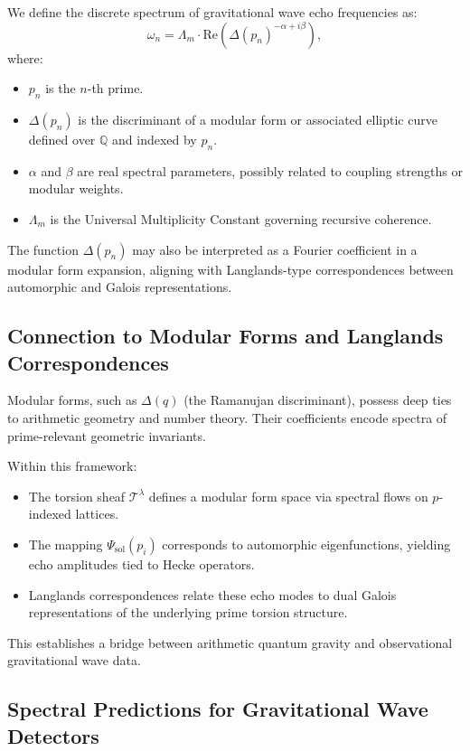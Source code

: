 \documentclass{article}
\theoremstyle{plain}
\begin{document}
We define the discrete spectrum of gravitational wave echo frequencies as:
\[
\omega_n = \Lambda_m \cdot \text{Re}\left(\Delta(p_n)^{-\alpha + i\beta} \right),
\]
where:
\begin{itemize}
    \item $p_n$ is the $n$-th prime.
    \item $\Delta(p_n)$ is the discriminant of a modular form or associated elliptic curve defined over $\mathbb{Q}$ and indexed by $p_n$.
    \item $\alpha$ and $\beta$ are real spectral parameters, possibly related to coupling strengths or modular weights.
    \item $\Lambda_m$ is the Universal Multiplicity Constant governing recursive coherence.
\end{itemize}

The function $\Delta(p_n)$ may also be interpreted as a Fourier coefficient in a modular form expansion, aligning with Langlands-type correspondences between automorphic and Galois representations.

\subsection{Connection to Modular Forms and Langlands Correspondences}

Modular forms, such as $\Delta(q)$ (the Ramanujan discriminant), possess deep ties to arithmetic geometry and number theory. Their coefficients encode spectra of prime-relevant geometric invariants.

Within this framework:
\begin{itemize}
    \item The torsion sheaf $\mathcal{T}^\lambda$ defines a modular form space via spectral flows on $p$-indexed lattices.
    \item The mapping $\Psi_{\text{sol}}(p_i)$ corresponds to automorphic eigenfunctions, yielding echo amplitudes tied to Hecke operators.
    \item Langlands correspondences relate these echo modes to dual Galois representations of the underlying prime torsion structure.
\end{itemize}

This establishes a bridge between arithmetic quantum gravity and observational gravitational wave data.

\subsection{Spectral Predictions for Gravitational Wave Detectors}
\end{document}
